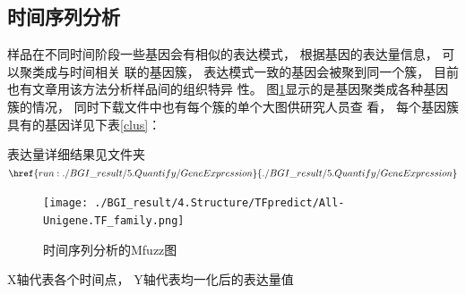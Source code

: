\documentclass[10pt, oneside,a4paper]{article}
\begin{document}
\subsection{时间序列分析}
样品在不同时间阶段一些基因会有相似的表达模式， 根据基因的表达量信息， 可以聚类成与时间相关
联的基因簇， 表达模式一致的基因会被聚到同一个簇， 目前也有文章用该方法分析样品间的组织特异
性。 图\ref{time}显示的是基因聚类成各种基因簇的情况， 同时下载文件中也有每个簇的单个大图供研究人员查
看， 每个基因簇具有的基因详见下表\ref{clus}：\par
表达量详细结果见文件夹$\href{run:./BGI\_result/5.Quantify/GeneExpression}{./BGI\_result/5.Quantify/GeneExpression}$\par
\begin{table}[H]
\centering
\renewcommand{\tablename}{表}
\end{table}

\begin{figure}[H]
\centering
\texttt{[image: ./BGI\_result/4.Structure/TFpredict/All-Unigene.TF\_family.png]}
\par
\renewcommand{\figurename}{图}
\caption{时间序列分析的Mfuzz图}
\label{time}
\end{figure}
\begin{center}
X轴代表各个时间点， Y轴代表均一化后的表达量值
\end{center}
\end{document}
